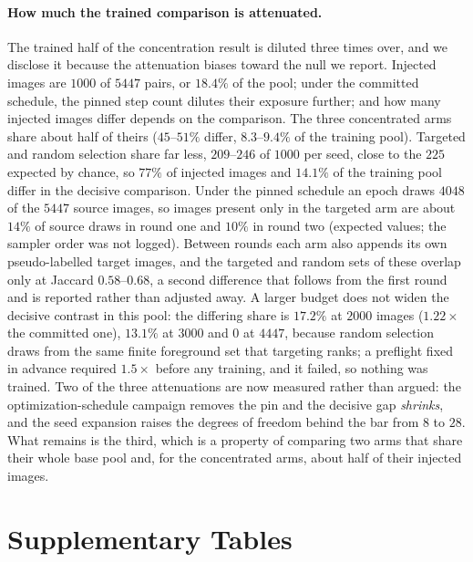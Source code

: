\documentclass{article}
\newif\ifrevmarked \revmarkedtrue
\DeclareRobustCommand{\revC}[1]{\ifrevmarked{\color{RevC}#1}\else{#1}\fi}
\begin{document}
\paragraph{How much the trained comparison is attenuated.} The trained half of the concentration
result is diluted three times over, and we disclose it because the attenuation biases toward the
null we report. Injected images are $1000$ of $5447$ pairs, or $18.4\%$ of the pool; under the
committed schedule, the pinned step count dilutes their exposure further; and \revC{how many injected images differ depends
on the comparison. The three concentrated arms share about half of theirs ($45$--$51\%$ differ, $8.3$--$9.4\%$ of the
training pool). Targeted and random selection share far less, $209$--$246$ of $1000$ per seed, close to the $225$
expected by chance, so $77\%$ of injected images and $14.1\%$ of the training pool differ in the decisive comparison.
Under the pinned schedule an epoch draws $4048$ of the $5447$ source images, so images present only in the targeted arm
are about $14\%$ of source draws in round one and $10\%$ in round two (expected values; the sampler order was not
logged). Between rounds each arm also appends its own pseudo-labelled target images, and the targeted and random sets
of these overlap only at Jaccard $0.58$--$0.68$, a second difference that follows from the first round and is reported
rather than adjusted away. A larger budget does not widen the decisive contrast in this pool: the differing share is
$17.2\%$ at $2000$ images ($1.22\times$ the committed one), $13.1\%$ at $3000$ and $0$ at $4447$, because random
selection draws from the same finite foreground set that targeting ranks; a preflight fixed in advance required
$1.5\times$ before any training, and it failed, so nothing was trained.} Two of the
three \revC{attenuations} are now measured rather than argued: the optimization-schedule campaign removes the pin and
the decisive gap \emph{shrinks}, and the seed expansion raises the degrees of freedom behind the
bar from $8$ to $28$. What remains is the third, which is a property of comparing two arms that
share their whole base pool \revC{and, for the concentrated arms, about half of their injected images}.

\section{Supplementary Tables}
\label{app:tables}




\end{document}
